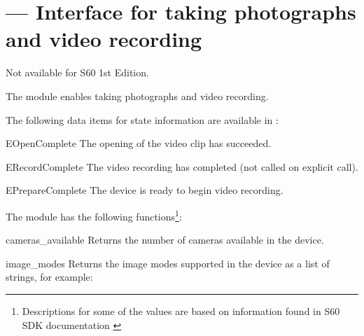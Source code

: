%
%
%

\section{ ---
    Interface for taking photographs and video recording}

\label{sec:camera}

\begin{notice}[note]
Not available for S60 1st Edition.
\end{notice}

The  module enables taking photographs and video recording.

The following data items for state information are available in :

\begin{datadesc}{EOpenComplete}
The opening of the video clip has succeeded.
\end{datadesc}

\begin{datadesc}{ERecordComplete}
The video recording has completed (not called on explicit  
call).
\end{datadesc}

\begin{datadesc}{EPrepareComplete}
The device is ready to begin video recording.
\end{datadesc}

The  module has the following functions\footnote{Descriptions 
for some of the values are based on information found in S60 SDK documentation 
\cite{S60Doc}}:

\begin{funcdesc}{cameras_available}{}
Returns the number of cameras available in the device.
\end{funcdesc}

\begin{funcdesc}{image_modes}{}
Returns the image modes supported in the device as a list of strings, for 
example: 
\end{funcdesc}

